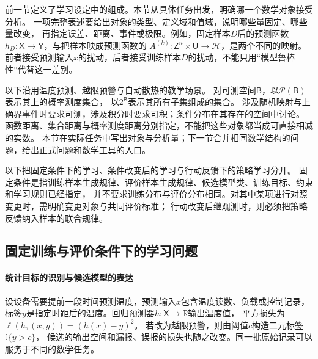 前一节定义了学习设定中的组成。本节从具体任务出发，明确哪一个数学对象接受分析。
一项完整表述要给出对象的类型、定义域和值域，说明哪些量固定、哪些量改变，
再指定误差、距离、事件或极限。例如，固定样本$D$后的预测函数
$h_D:\mathsf X\to\mathsf Y$，与把样本映成预测函数的
$A^{(k)}:\mathsf Z^n\times\mathsf U\to\mathcal H$，是两个不同的映射。
前者接受预测输入$x$的扰动，后者接受训练样本$D$的扰动，不能只用“模型鲁棒性”代替这一差别。

以下沿用温度预测、越限预警与自动散热的教学场景。
对可测空间$\mathsf B$，以$\mathcal P(\mathsf B)$表示其上的概率测度集合，
以$2^{\mathsf B}$表示其所有子集组成的集合。
涉及随机映射与上确界事件时要求可测，涉及积分时要求可积；条件分布在其存在的空间中讨论。
函数距离、集合距离与概率测度距离分别指定，不能把这些对象都当成可直接相减的实数。
本节在实际任务中写出对象与分析量；下一节合并相同数学结构的问题，给出正式问题和数学工具的入口。

以下把固定条件下的学习、条件改变后的学习与行动反馈下的策略学习分开。
固定条件是指训练样本生成规律、评价样本生成规律、候选模型类、训练目标、约束和学习规则已经指定，
并不要求训练分布与评价分布相同。对其中某项进行对照变更时，需明确变更对象与共同评价标准；
行动改变后继观测时，则必须把策略反馈纳入样本的联合规律。

\subsection{固定训练与评价条件下的学习问题}
\label{sec:future-fixed-learning-conditions}

\paragraph{统计目标的识别与候选模型的表达}
\label{sec:future-ml-information-expression}

设设备需要提前一段时间预测温度，预测输入$x$包含温度读数、负载或控制记录，
标签$y$是指定时距后的温度。回归预测器$h:\mathsf X\to\mathbb R$输出温度值，
平方损失为$\ell(h,(x,y))=(h(x)-y)^2$。
若改为越限预警，则由阈值$c$构造二元标签$\mathbb I\{y>c\}$，
候选的输出空间和漏报、误报的损失也随之改变。同一批原始记录可以服务于不同的数学任务。

